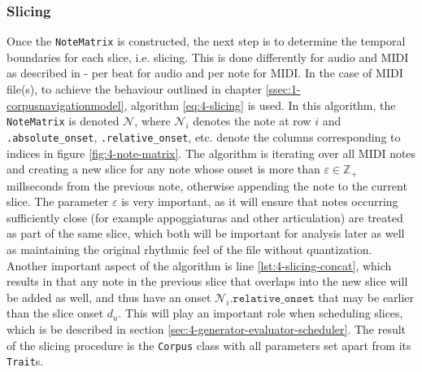 \subsubsection{Slicing}\label{sec:4-corpus-builder-slicing}
Once the \texttt{NoteMatrix} is constructed, the next step is to determine the temporal boundaries for each slice, i.e. slicing. This is done differently for audio and MIDI as described in \cite{somaxtheory2021} - per beat for audio and per note for MIDI. In the case of MIDI file(s), to achieve the behaviour outlined in chapter \ref{ssec:1-corpusnavigationmodel}, algorithm \ref{eq:4-slicing} is used. In this algorithm, the \texttt{NoteMatrix} is denoted $\mathcal N$, where $\mathcal N_i$ denotes the note at row $i$ and \texttt{.absolute\_onset}, \texttt{.relative\_onset}, etc. denote the columns corresponding to indices in figure \ref{fig:4-note-matrix}. The algorithm is iterating over all MIDI notes and creating a new slice for any note whose onset is more than $\varepsilon \in \mathbb Z_+$ millseconds from the previous note, otherwise appending the note to the current slice. The parameter $\varepsilon$ is very important, as it will ensure that notes occurring sufficiently close (for example appoggiaturas and other articulation) are treated as part of the same slice, which both will be important for analysis later as well as maintaining the original rhythmic feel of the file without quantization. Another important aspect of the algorithm is line \ref{lst:4-slicing-concat}, which results in that any note in the previous slice that overlaps into the new slice will be added as well, and thus have an onset $\mathcal N_i\texttt{.relative\_onset}$ that may be earlier than the slice onset $d_u$. This will play an important role when scheduling slices, which is be described in section \ref{sec:4-generator-evaluator-scheduler}. The result of the slicing procedure is the \texttt{Corpus} class with all parameters set apart from its \texttt{Trait}s.


